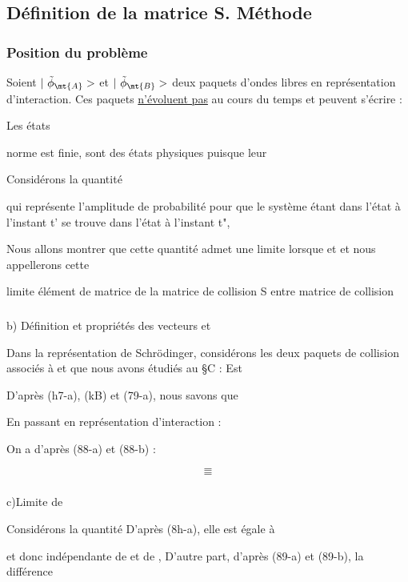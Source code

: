 \subsection{Définition de la matrice S. Méthode}%
\subsubsection{Position du problème}%
Soient $|\ \tilde{\phi}_\mt{A}>$ et $|\ \tilde{\phi}_\mt{B}>$ deux paquets d'ondes libres
en représentation d'interaction. Ces paquets \ul{n'évoluent pas} au
cours du temps et peuvent s'écrire :

Les états 

norme est finie,
 sont des états physiques puisque leur

Considérons la quantité

qui représente l'amplitude de probabilité pour que le système
étant dans l'état  à l'instant t' se trouve dans l'état
à l'instant t",

Nous allons montrer que cette quantité admet une
limite lorsque  et  et nous appellerons cette

limite élément de matrice de la matrice de collision S entre
 matrice de collision 

%

\subsubsection{}%
b) Définition et propriétés des vecteurs  et 

Dans la représentation de Schrödinger, considérons les deux
paquets de collision associés à  et  que nous avons
étudiés au \S C : Est

D'après (h7-a), (kB) et (79-a), nous savons que

En passant en représentation d'interaction :

On a d'après (88-a) et (88-b) :

\[
\tag{89-a}=
\]
\[
\tag{89-b}=
\]


\subsubsection{}%
c)Limite de 

Considérons la quantité
D'après (8h-a), elle est égale à

et donc indépendante de  et de ,
D'autre part, d'après (89-a) et (89-b), la différence

